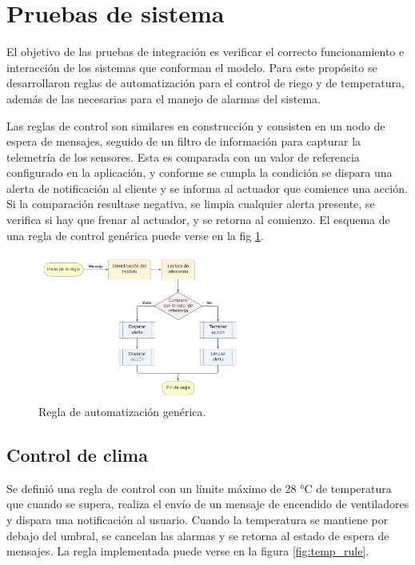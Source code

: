 \section{Pruebas de sistema}
\label{sec:Pruebas de sistema}

El objetivo de las pruebas de integración es verificar el correcto funcionamiento e interacción de los sistemas que conforman el modelo. Para este propósito se desarrollaron reglas de automatización para el control de riego y de temperatura, además de las necesarias para el manejo de alarmas del sistema. 

Las reglas de control son similares en construcción y consisten en un nodo de espera de mensajes, seguido de un filtro de información para capturar la telemetría de los sensores. Esta es comparada con un valor de referencia configurado en la aplicación, y conforme se cumpla la condición se dispara una alerta de notificación al cliente y se informa al actuador que comience una acción. Si la comparación resultase negativa, se limpia cualquier alerta presente, se verifica si hay que frenar al actuador, y se retorna al comienzo.
El esquema de una regla de control genérica puede verse en la fig \ref{fig:basic_rule}.

\begin{figure}[h]
	\centering
	\includegraphics[width=0.6\textwidth]{./Figures/chapter4/ReglaBasica.jpg}
	\caption[Regla de automatización genérica]{Regla de automatización genérica.}
	\label{fig:basic_rule}
\end{figure}

\pagebreak

\subsection{Control de clima}
\label{sec:Control de clima}

Se definió una regla de control con un límite máximo de 28 °C de temperatura que cuando se supera, realiza el envío de un mensaje de encendido de ventiladores y dispara una notificación al usuario. Cuando la temperatura se mantiene por debajo del umbral, se cancelan las alarmas y se retorna al estado de espera de mensajes. La regla implementada puede verse en la figura \ref{fig:temp_rule}.  

